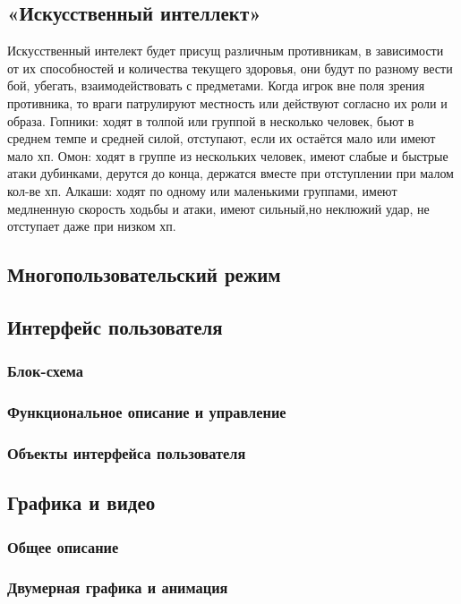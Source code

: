 \documentclass[12pt]{article}
\begin{document}
    \subsection{«Искусственный интеллект»}
            Искусственный интелект будет присущ различным противникам, в зависимости от их способностей и количества текущего здоровья, они будут по разному вести бой, убегать, взаимодействовать с предметами. Когда игрок вне поля зрения противника, то враги патрулируют местность или действуют согласно их роли и образа. Гопники: ходят в толпой или группой в несколько человек, бьют в среднем темпе и средней силой, отступают, если их остаётся мало или имеют мало хп. Омон: ходят в группе из нескольких человек, имеют слабые и быстрые атаки дубинками, дерутся до конца, держатся вместе при отступлении при малом кол-ве хп. Алкаши: ходят по одному или маленькими группами, имеют медлненную скорость ходьбы и атаки, имеют сильный,но неклюжий удар, не отступает даже при низком хп. 
    \subsection{Многопользовательский режим}
    \subsection{Интерфейс пользователя}
        \subsubsection{Блок-схема}
        \subsubsection{Функциональное описание и управление}
        \subsubsection{Объекты интерфейса пользователя}
    \subsection{Графика и видео}
        \subsubsection{Общее описание}
        \subsubsection{Двумерная графика и анимация}
\end{document}
